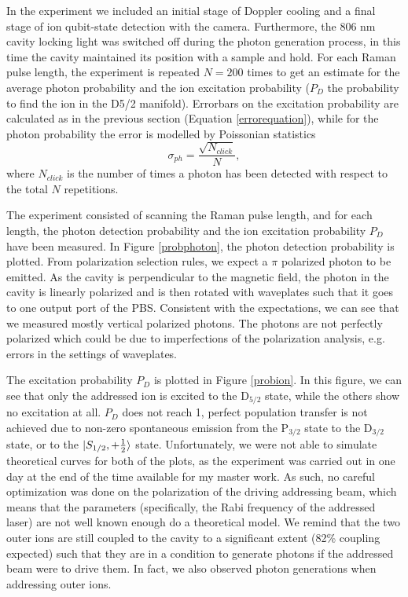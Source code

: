 In the experiment we included an initial stage of Doppler cooling and a final stage of ion qubit-state detection with the camera. Furthermore, the 806 nm cavity locking light was switched off during the photon generation process, in this time the cavity maintained its position with a sample and hold. For each Raman pulse length, the experiment is repeated $N=200$ times to get an estimate for the average photon probability and the ion excitation probability ($P_D$ the probability to find the ion in the D5/2 manifold). Errorbars on the excitation probability are calculated as in the previous section (Equation \eqref{errorequation}), while for the photon probability the error is modelled by Poissonian statistics \cite{quantumoptics}
\begin{equation}
\sigma_{ph} = \frac{\sqrt{N_{click}}}{N},
\end{equation}
where $N_{click}$ is the number of times a photon has been detected with respect to the total $N$ repetitions. \par
The experiment consisted of scanning the Raman pulse length, and for each length, the photon detection probability and the ion excitation probability $P_D$ have been measured. In Figure \ref{probphoton}, the photon detection probability is plotted. From polarization selection rules, we expect a $\pi$ polarized photon to be emitted. As the cavity is perpendicular to the magnetic field, the photon in the cavity is linearly polarized and is then rotated with waveplates such that it goes to one output port of the PBS. Consistent with the expectations, we can see that we measured mostly vertical polarized photons. The photons are not perfectly polarized which could be due to imperfections of the polarization analysis, e.g. errors in the settings of waveplates.\par
The excitation probability $P_D$ is plotted in Figure \ref{probion}. In this figure, we can see that only the addressed ion is excited to the $\text{D}_{5/2}$ state, while the others show no excitation at all. $P_D$ does not reach 1, perfect population transfer is not achieved due to non-zero spontaneous emission from the $\text{P}_{3/2}$ state to the $\text{D}_{3/2}$ state, or to the $\ket{S_{1/2},+\frac{1}{2}}$ state. Unfortunately, we were not able to simulate theoretical curves for both of the plots, as the experiment was carried out in one day at the end of the time available for my master work. As such, no careful optimization was done on the polarization of the driving addressing beam, which means that the parameters (specifically, the Rabi frequency of the addressed laser) are not well known enough do a theoretical model. We remind that the two outer ions are still coupled to the cavity to a significant extent (82\% coupling expected) such that they are in a condition to generate photons if the addressed beam were to drive them. In fact, we also observed photon generations when addressing outer ions.\par
